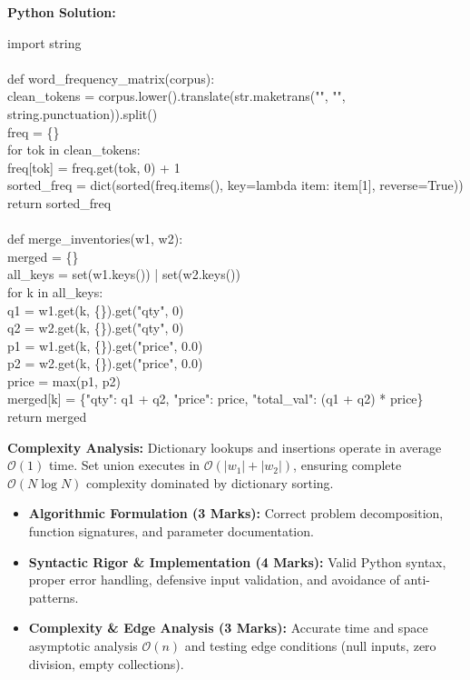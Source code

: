 \begin{solbox}
\textbf{Python Solution:}
\begin{pycode}
import string\\
~\\
def word\_frequency\_matrix(corpus):\\
\quad clean\_tokens = corpus.lower().translate(str.maketrans("", "", string.punctuation)).split()\\
\quad freq = \{\}\\
\quad for tok in clean\_tokens:\\
\quad \quad freq[tok] = freq.get(tok, 0) + 1\\
\quad sorted\_freq = dict(sorted(freq.items(), key=lambda item: item[1], reverse=True))\\
\quad return sorted\_freq\\
~\\
def merge\_inventories(w1, w2):\\
\quad merged = \{\}\\
\quad all\_keys = set(w1.keys()) | set(w2.keys())\\
\quad for k in all\_keys:\\
\quad \quad q1 = w1.get(k, \{\}).get("qty", 0)\\
\quad \quad q2 = w2.get(k, \{\}).get("qty", 0)\\
\quad \quad p1 = w1.get(k, \{\}).get("price", 0.0)\\
\quad \quad p2 = w2.get(k, \{\}).get("price", 0.0)\\
\quad \quad price = max(p1, p2)\\
\quad \quad merged[k] = \{"qty": q1 + q2, "price": price, "total\_val": (q1 + q2) * price\}\\
\quad return merged
\end{pycode}
\textbf{Complexity Analysis:} Dictionary lookups and insertions operate in average $\mathcal{O}(1)$ time. Set union executes in $\mathcal{O}(|w_1| + |w_2|)$, ensuring complete $\mathcal{O}(N \log N)$ complexity dominated by dictionary sorting.
\end{solbox}

\begin{examinertip}
\begin{itemize}[leftmargin=1.5em, itemsep=2pt]
    \item \textbf{Algorithmic Formulation (3 Marks):} Correct problem decomposition, function signatures, and parameter documentation.
    \item \textbf{Syntactic Rigor \& Implementation (4 Marks):} Valid Python syntax, proper error handling, defensive input validation, and avoidance of anti-patterns.
    \item \textbf{Complexity \& Edge Analysis (3 Marks):} Accurate time and space asymptotic analysis $\mathcal{O}(n)$ and testing edge conditions (null inputs, zero division, empty collections).
\end{itemize}
\end{examinertip}
